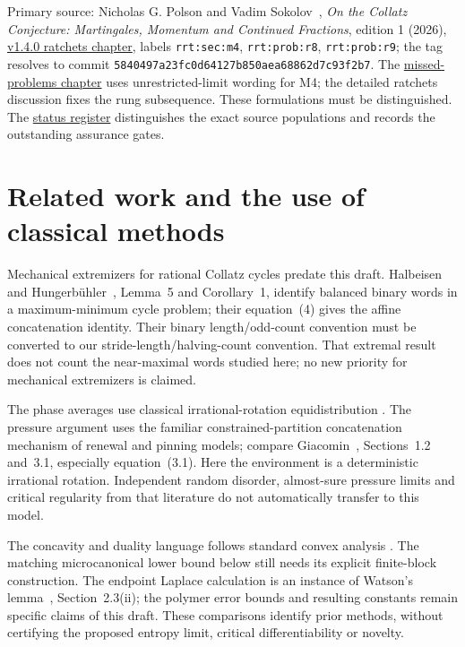 \documentclass[11pt,letterpaper]{article}
\begin{document}
Primary source: Nicholas G. Polson and Vadim Sokolov~\cite{polson}, \emph{On the Collatz Conjecture: Martingales, Momentum and Continued Fractions}, edition 1 (2026), \href{https://github.com/VadimSokolov/collatz/blob/5840497a23fc0d64127b850aea68862d7c93f2b7/book/chapters/ch10h_ratchets.tex}{v1.4.0 ratchets chapter}, labels \texttt{rrt:sec:m4}, \texttt{rrt:prob:r8}, \texttt{rrt:prob:r9}; the tag resolves to commit \nolinkurl{5840497a23fc0d64127b850aea68862d7c93f2b7}. The \href{https://github.com/VadimSokolov/collatz/blob/5840497a23fc0d64127b850aea68862d7c93f2b7/book/chapters/ch10f_missed.tex}{missed-problems chapter} uses unrestricted-limit wording for M4; the detailed ratchets discussion fixes the rung subsequence. These formulations must be distinguished. The \href{../external_problems/README.md}{status register} distinguishes the exact source populations and records the outstanding assurance gates.

\section{Related work and the use of classical methods}
Mechanical extremizers for rational Collatz cycles predate this draft.
Halbeisen and Hungerb\"uhler~\cite{halbeisen-hungerbuhler}, Lemma~5 and
Corollary~1, identify balanced binary words in a maximum-minimum cycle problem;
their equation~(4) gives the affine concatenation identity. Their binary
length/odd-count convention must be converted to our stride-length/halving-count
convention. That extremal result does not count the near-maximal words studied
here; no new priority for mechanical extremizers is claimed.

The phase averages use classical irrational-rotation equidistribution
\cite{weyl}. The pressure argument uses the familiar constrained-partition
concatenation mechanism of renewal and pinning models; compare
Giacomin~\cite{giacomin}, Sections~1.2 and~3.1, especially equation~(3.1).
Here the environment is a deterministic irrational rotation. Independent
random disorder, almost-sure pressure limits and critical regularity from
that literature do not automatically transfer to this model.

The concavity and duality language follows standard convex analysis
\cite{rockafellar}. The matching microcanonical lower bound below still needs
its explicit finite-block construction. The endpoint Laplace calculation is
an instance of Watson's lemma~\cite{dlmf}, Section~2.3(ii); the polymer error
bounds and resulting constants remain specific claims of this draft. These
comparisons identify prior methods, without certifying the proposed entropy
limit, critical differentiability or novelty.
\end{document}
